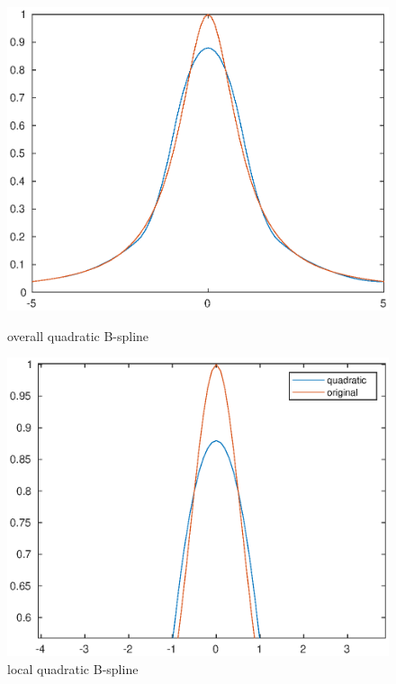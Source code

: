 \documentclass[twoside,a4paper]{article}
\begin{document}
\begin{figure}[h]
\includegraphics[width=6in]{./figure/quadratic_overall.eps}
\caption{overall quadratic B-spline}
\includegraphics[width=6in]{./figure/quadratic_local.eps}
\caption{local quadratic B-spline}
\end{figure}
\end{document}
